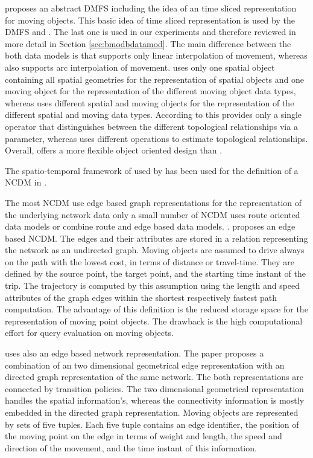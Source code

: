 \documentclass[a4paper]{article}
\begin{document}
\cite{RepresentingMovingObjectsGueting} proposes an abstract DMFS including the
idea of an time sliced representation for moving objects. This basic idea of
time sliced representation is used by the DMFS \cite{STAUPelekis} and
\cite{DataModelDataStructureGueting}. The last one is used in our experiments
and therefore reviewed in more detail in Section \ref{sec:bmodbdatamod}.
The main difference between the both data models is that
\cite{DataModelDataStructureGueting} supports only linear interpolation of movement,
whereas \cite{STAUPelekis} also supports arc interpolation of movement.
\cite{STAUPelekis} uses only one spatial object
containing all spatial geometries for the representation of spatial objects and
one moving object for the representation of the different moving object data types,
whereas \cite{DataModelDataStructureGueting} uses different spatial and moving
objects for the representation of the different spatial and moving data types.
According to this \cite{STAUPelekis} provides only a single operator that distinguishes
between the different topological relationships via a parameter, whereas
\cite{DataModelDataStructureGueting} uses different operations to estimate
topological relationships. Overall, \cite{STAUPelekis} offers a more flexible
object oriented design than \cite{DataModelDataStructureGueting}.

The spatio-temporal framework of \cite{RepresentingMovingObjectsGueting} used by
\cite{DataModelDataStructureGueting} has been used for the definition of a
NCDM in \cite{NetworkGueting}.

The most NCDM use edge based graph representations for the representation of the
underlying network data only a small number of NCDM uses route oriented data models
or combine route and edge based data models.
.
\cite{NetworkVazirgiannis} proposes an edge based NCDM. The edges and their attributes
are stored in a relation representing the network as an undirected graph. Moving
objects are assumed to drive always on the path with the lowest cost,
in terms of distance or travel-time. They are defined by the source point, the
target point, and the starting time instant of the trip. The trajectory is
computed by this assumption using the length and speed attributes of the graph
edges within the shortest respectively fastest path computation.
The advantage of this definition is the reduced storage space for the representation
of moving point objects. The drawback is the high computational effort for query
evaluation on moving objects.

\cite{NetworkJensen} uses also an edge based network representation. The paper
proposes a combination of an two dimensional geometrical edge representation with
an directed graph representation of the same network. The both representations
are connected by transition policies. The two dimensional
geometrical representation handles the spatial information's, whereas the connectivity
information is mostly embedded in the directed graph representation.
Moving objects are represented by sets of five tuples. Each five tuple contains
an edge identifier, the position of the moving point on the edge
in terms of weight and length, the speed and direction of the movement, and
the time instant of this information.
\end{document}
